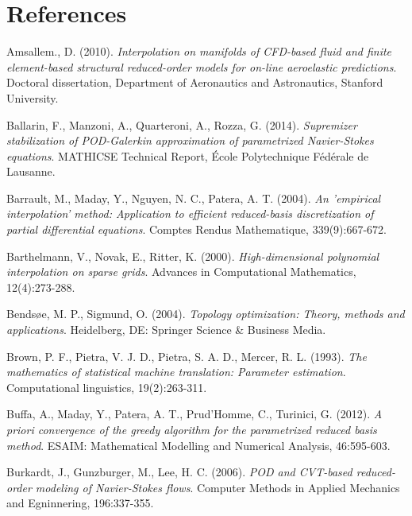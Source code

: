 \documentclass{elsarticle}
\theoremstyle{theorem}
\theoremstyle{definition}
\theoremstyle{remark}
\theoremstyle{proposition}
\numberwithin{figure}{section}
\begin{document}
	
	
	\clearpage
	
	\section*{References}
		
	\begin{thebibliography}{50}
		
		Amsallem., D. (2010). \emph{Interpolation on manifolds of CFD-based fluid and finite element-based structural reduced-order models for on-line aeroelastic predictions}. Doctoral dissertation, Department of Aeronautics and Astronautics, Stanford University.
		
		Ballarin, F., Manzoni, A., Quarteroni, A., Rozza, G. (2014). \emph{Supremizer stabilization of POD-Galerkin approximation of parametrized Navier-Stokes equations}. MATHICSE Technical Report, \'Ecole Polytechnique F\'ed\'erale de Lausanne.
	
		Barrault, M., Maday, Y., Nguyen, N. C., Patera, A. T. (2004). \emph{An 'empirical interpolation' method: Application to efficient reduced-basis discretization of partial differential equations}. Comptes Rendus Mathematique, 339(9):667-672.
		
		Barthelmann, V., Novak, E., Ritter, K. (2000). \emph{High-dimensional polynomial interpolation on sparse grids}. Advances in Computational Mathematics, 12(4):273-288.
		
		Bends\o{}e, M. P., Sigmund, O. (2004). \emph{Topology optimization: Theory, methods and applications}. Heidelberg, DE: Springer Science \& Business Media. 
		
		Brown, P. F., Pietra, V. J. D., Pietra, S. A. D., Mercer, R. L. (1993). \emph{The mathematics of statistical machine translation: Parameter estimation}. Computational linguistics, 19(2):263-311.
		
		Buffa, A., Maday, Y., Patera, A. T., Prud'Homme, C., Turinici, G. (2012). \emph{A priori convergence of the greedy algorithm for the parametrized reduced basis method}. ESAIM: Mathematical Modelling and Numerical Analysis, 46:595-603.
		
		Burkardt, J., Gunzburger, M., Lee, H. C. (2006). \emph{POD and CVT-based reduced-order modeling of Navier-Stokes flows}. Computer Methods in Applied Mechanics and Egninnering, 196:337-355.
		

\end{thebibliography}
\end{document}
